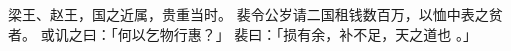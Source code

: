 
\switchcolumn*[\section{}]

梁王、赵王，国之近属，贵重当时。
裴令公岁请二国租钱数百万，以恤中表之贫者。
或讥之曰：「何以乞物行惠？」
裴曰：「损有余，补不足，天之道也 。」

\switchcolumn


